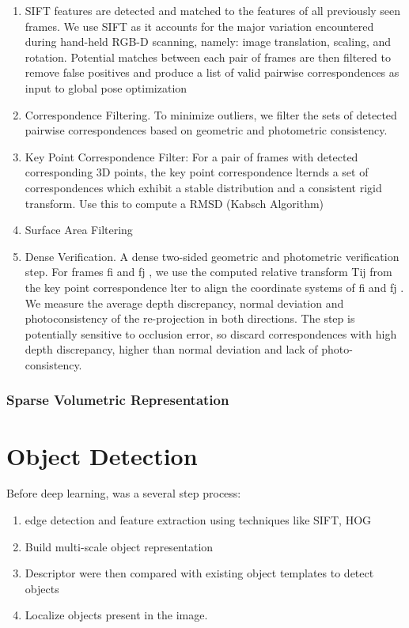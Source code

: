 \begin{enumerate}
\begin{enumerate}
\item SIFT features are detected and matched to the features of all previously seen frames. We use SIFT as it accounts for the major variation encountered during hand-held RGB-D scanning, namely: image translation, scaling, and rotation. Potential matches between each pair of frames are then filtered to remove false positives and produce a list of valid pairwise correspondences as input to global pose optimization
%
\item Correspondence Filtering. To minimize outliers, we filter the sets of detected pairwise correspondences based on geometric and photometric consistency.
%
\item Key Point Correspondence Filter: For a pair of frames with detected corresponding 3D points, the key point correspondence  lternds a set of correspondences which exhibit a stable distribution and a consistent rigid transform. Use this to compute a RMSD (Kabsch Algorithm)
%
\item Surface Area Filtering
%
\item Dense Verification. A dense two-sided geometric and photometric verification step. For frames fi and fj , we use the computed relative transform Tij from the key point correspondence lter to align the coordinate systems of fi and fj . We measure the average depth discrepancy, normal deviation and photoconsistency of the re-projection in both directions. The step is potentially sensitive to occlusion error, so discard correspondences with high depth discrepancy, higher than normal deviation and lack of photo-consistency.
\end{enumerate}

\subsubsection{Sparse Volumetric Representation}

\section{Object Detection}

Before deep learning, was a several step process: 

\begin{enumerate}
\item edge detection and feature extraction using techniques like SIFT, HOG 
\item Build multi-scale object representation
\item Descriptor were then compared with existing object templates to detect objects
\item Localize objects present in the image.
\end{enumerate}


\end{enumerate}
